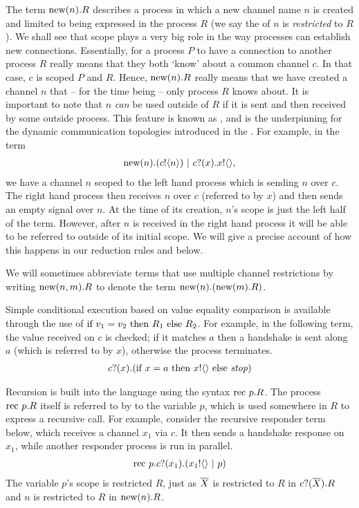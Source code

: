 	The term $\text{new}({n}). R$ describes a process in which a new channel name $n$ is created and limited to being expressed in the process $R$ (we say the  of $n$ is \emph{restricted} to $R$).  
We shall see that scope plays a very big role in the way processes can establish new connections.  
Essentially, for a process $P$ to have a connection to another process $R$ really means that they both `know' about a common channel $c$.  
In that case, $c$ is scoped $P$ and $R$.  
Hence, $\text{new}({n}). R$ really means that we have created a channel $n$ that -- for the time being -- only process $R$ knows about.  
It is important to note that $n$ \emph{can} be used outside of $R$ if it is sent and then received by some outside process.  
This feature is known as , and is the underpinning for the dynamic communication topologies introduced in the \picalc.  
For example, in the term
\begin{align}
	\text{new}({n}). ({c}!\langle{n}\rangle) \ |\  {c}?({x}). {x}!\langle{}\rangle,
\end{align}
	we have a channel $n$ scoped to the left hand process which is sending $n$ over $c$. 
	The right hand process then receives $n$ over $c$ (referred to by $x$) and then sends an empty signal over $n$.  
At the time of its creation, $n$'s scope is just the left half of the term.  
However, after $n$ is received in the right hand process it will be able to be referred to outside of its initial scope.  
We will give a precise account of how this happens in our reduction rules and  below.
	
	We will sometimes abbreviate terms that use multiple channel restrictions by writing $\text{new}({n,m}).R$ to denote the term $\text{new}({n}).(\text{new}({m}).R)$. 
	
	Simple conditional execution based on value equality comparison is available through the use of $\text{if } {v_1 = v_2}\text{ then } R_1 \text{ else } R_2$.  
For example, in the following term, the value received on $c$ is checked; if it matches $a$ then a handshake is sent along $a$ (which is referred to by $x$), otherwise the process terminates.
	\begin{align}
		{c}?({x}).(\text{if } {x=a} \text{ then } {x}!\langle{}\rangle \text{ else } \mbox{\emph{stop}})
	\end{align}
	
	Recursion is built into the language using the syntax $\text{rec }{p}.R$.
The process $\text{rec }{p}.R$ itself is referred to by to the variable $p$, which is used somewhere in $R$ to express a recursive call.  
For example, consider the recursive responder term below, which receives a channel $x_1$ via $c$.  
It then sends a handshake response on $x_1$, while another responder process is run in parallel.
	\begin{align}
		\text{rec }{p}.{c}?({x_1}).({x_1}!\langle{}\rangle \ |\  p)
		\label{reclistenerterm}
	\end{align}
The variable $p$'s scope is restricted $R$, just as $\overline{X}$ is restricted to $R$ in ${c}?({\overline{X}}).R$ and $n$ is restricted to $R$ in $\text{new}({n}).R$.
	

